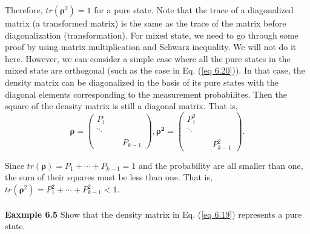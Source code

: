 \documentclass{article}
\begin{document}
Therefore, $tr(\boldsymbol{\rho}^2)=1$ for a pure state. Note that the trace of a diagonalized
matrix (a transformed matrix) is the same as the trace of the matrix before diagonalization
(transformation). For mixed state, we need to go through some proof by using matrix
multiplication and Schwarz inequality. We will not do it here. However, we can consider
a simple case where all the pure states in the mixed state are orthogonal
(such as the case in Eq. (\ref{eq 6.20})). In that case, the density matrix can be diagonalized in the
basis of its pure states with the diagonal elements corresponding to the
measurement probabilites. Then the square of the density matrix is still a diagonal matrix. That is,
\begin{equation} \label{eq 6.28}
    \boldsymbol{\rho}=\begin{pmatrix}
        P_1 \quad \quad \quad  \\  \ddots \quad\\\quad \quad  \quad\\ \quad \quad \quad P_{k-1}
    \end{pmatrix}, \boldsymbol{\rho^2}=\begin{pmatrix}
        P_1^2 \quad \quad \quad  \\  \ddots \quad\\\quad \quad  \quad\\ \quad \quad \quad P_{k-1}^2
    \end{pmatrix}.\tag{6.28}
\end{equation}

Since $tr(\boldsymbol{\rho})=P_1+\cdots+P_{k-1}=1$ and the probability are all smaller
than one, the sum of their squares must be less than one. That is, $tr(\boldsymbol{\rho}^2)=
P_1^2+\cdots+P_{k-1}^2 <1$.\\\\
\textbf{Eaxmple 6.5} Show that the density matrix in Eq. (\ref{eq 6.19}) represents a pure state.
\end{document}
